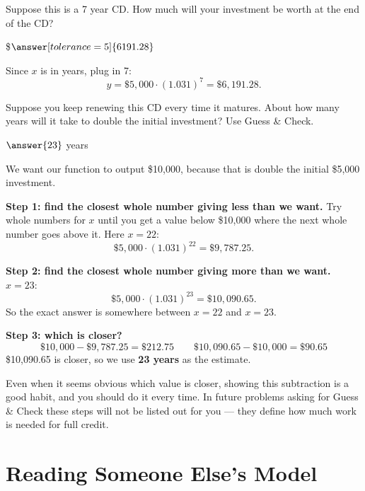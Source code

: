 \documentclass[12pt]{ximera}
\begin{document}
\begin{problem}
Suppose this is a 7 year CD. How much will your investment be worth at the end of the CD?

\$$\answer[tolerance=5]{6191.28}$

\begin{solution}
Since $x$ is in years, plug in 7:
\[
y = \$5{,}000 \cdot (1.031)^7 = \$6{,}191.28.
\]
\end{solution}
\end{problem}

\begin{problem}
Suppose you keep renewing this CD every time it matures. About how many years will it
take to double the initial investment? Use Guess \& Check.

$\answer{23}$ years

\begin{freeResponse}
\end{freeResponse}

\begin{solution}
We want our function to output \$10,000, because that is double the initial \$5,000
investment.

\textbf{Step 1: find the closest whole number giving less than we want.} Try whole
numbers for $x$ until you get a value below \$10,000 where the next whole number goes
above it. Here $x = 22$:
\[
\$5{,}000 \cdot (1.031)^{22} = \$9{,}787.25.
\]

\textbf{Step 2: find the closest whole number giving more than we want.} $x = 23$:
\[
\$5{,}000 \cdot (1.031)^{23} = \$10{,}090.65.
\]
So the exact answer is somewhere between $x = 22$ and $x = 23$.

\textbf{Step 3: which is closer?}
\[
\$10{,}000 - \$9{,}787.25 = \$212.75
\qquad
\$10{,}090.65 - \$10{,}000 = \$90.65
\]
\$10,090.65 is closer, so we use \textbf{23 years} as the estimate.

Even when it seems obvious which value is closer, showing this subtraction is a good
habit, and you should do it every time. In future problems asking for Guess \& Check
these steps will not be listed out for you --- they define how much work is needed for
full credit.
\end{solution}
\end{problem}

\section*{Reading Someone Else's Model}
\end{document}
